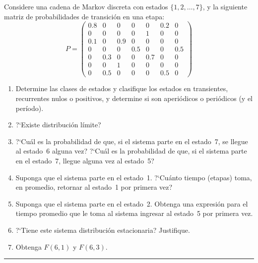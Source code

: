 \documentclass[10pt,a4paper]{article}
\newenvironment{enunciado}[1]{%
  \begin{tcolorbox}[
    breakable,
    colback=sectionbg!8, colframe=sectionbg,
    boxrule=0.8pt, arc=3pt, left=8pt, right=8pt, top=6pt, bottom=6pt,
    fonttitle=\normalsize\bfseries\sffamily, coltitle=white, colbacktitle=sectionbg, titlerule=0pt,
    title={#1},
  ]%
}{\end{tcolorbox}}
\begin{document}
\begin{enunciado}{P27 \textperiodcentered\ Cadena de Markov discreta con estados $\{1,\ldots,7\}$}
  Considere una cadena de Markov discreta con estados $\{1,2,\ldots,7\}$, y la
  siguiente matriz de probabilidades de transici\'on en una etapa:
  \[
    P = \begin{pmatrix}
      0.8 & 0   & 0   & 0   & 0   & 0.2 & 0   \\
      0   & 0   & 0   & 0   & 1   & 0   & 0   \\
      0.1 & 0   & 0.9 & 0   & 0   & 0   & 0   \\
      0   & 0   & 0   & 0.5 & 0   & 0   & 0.5 \\
      0   & 0.3 & 0   & 0   & 0.7 & 0   & 0   \\
      0   & 0   & 1   & 0   & 0   & 0   & 0   \\
      0   & 0.5 & 0   & 0   & 0   & 0.5 & 0
    \end{pmatrix}
  \]

  \begin{enumerate}[label=\alph*)]
    \item Determine las clases de estados y clasifique los estados en transientes,
          recurrentes nulos o positivos, y determine si son aperi\'odicos o peri\'odicos
          (y el per\'iodo).
    \item ?`Existe distribuci\'on l\'imite?
    \item ?`Cu\'al es la probabilidad de que, si el sistema parte en el estado~7, se
          llegue al estado~6 alguna vez? ?`Cu\'al es la probabilidad de que, si el
          sistema parte en el estado~7, llegue alguna vez al estado~5?
    \item Suponga que el sistema parte en el estado~1. ?`Cu\'anto tiempo (etapas) toma,
          en promedio, retornar al estado~1 por primera vez?
    \item Suponga que el sistema parte en el estado~2. Obtenga una expresi\'on para el
          tiempo promedio que le toma al sistema ingresar al estado~5 por primera vez.
    \item ?`Tiene este sistema distribuci\'on estacionaria? Justifique.
    \item Obtenga $F(6,1)$ y $F(6,3)$.
  \end{enumerate}
\end{enunciado}

\vspace{10pt}
{\color{subsecbg!60}\hrule}
\vspace{6pt}
\end{document}
